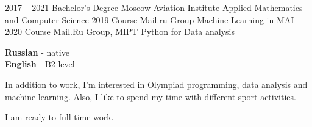 \documentclass[9pt]{developercv} %
\begin{document}
\vspace{0.2cm}



\begin{entrylist}
	\entry
		{2017 -- 2021}
		{Bachelor’s Degree}
		{Moscow Aviation Institute}
		{Applied Mathematics and Computer Science}
	\entry
		{2019}
		{Course}
		{Mail.ru Group}
		{Machine Learning in MAI}
	\entry
		{2020}
		{Course}
		{Mail.Ru Group, MIPT}
		{Python for Data analysis}
\end{entrylist}

\vspace{0.2cm}

\begin{minipage}[t]{0.3\textwidth}
	\vspace{-\baselineskip} %

	
	\textbf{Russian} - native\\
	\textbf{English} - B2 level\\

\end{minipage}
\hfill
\begin{minipage}[t]{0.3\textwidth}
	\vspace{-\baselineskip} %
	
	
	In addition to work, I'm interested in Olympiad programming, data analysis and machine learning. Also, I like to spend my time with different sport activities.
\end{minipage}
\hfill
\begin{minipage}[t]{0.3\textwidth}
	\vspace{-\baselineskip} %
	
	
	I am ready to full time work.
	
\end{minipage}

\end{document}
